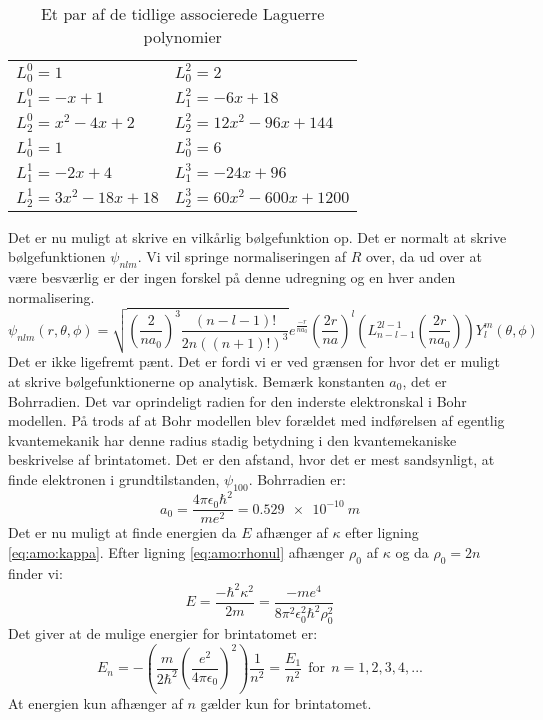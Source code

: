 \documentclass[../../Atom-ogMolekylefysik.tex]{subfiles}
\begin{document}
\begin{table}[h]
    \centering
    \begin{tabular}{ll}
        $L_0^0 = 1$ & $L_0^2 = 2$\\
        $L_1^0 = -x+1$ & $L_1^2 = -6x+18$\\
        $L_2^0 = x^2-4x+2$ & $L_2^2 = 12x^2-96x+144$\\
        $L_0^1 = 1$ & $L_0^3 = 6$\\
        $L_1^1 = -2x+4$ & $L_1^3 = -24x+96$\\
        $L_2^1 = 3x^2-18x+18$ & $L_2^3 = 60x^2-600x+1200$\\
    \end{tabular}
    \caption{Et par af de tidlige associerede Laguerre polynomier}
    \label{tab:amo:laguerre}
\end{table}
Det er nu muligt at skrive en vilkårlig bølgefunktion op. Det er normalt at skrive bølgefunktionen $\psi_{nlm}$. Vi vil springe normaliseringen af $R$ over, da ud over at være besværlig er der ingen forskel på denne udregning og en hver anden normalisering.
\begin{equation}
    \psi_{nlm}(r,\theta,\phi) = \sqrt{\left(\frac{2}{na_0}\right)^3\frac{(n-l-1)!}{2n((n+1)!)^3}}e^{\frac{-r}{na_0}}\left(\frac{2r}{na}\right)^l\left(L_{n-l-1}^{2l-1}\left(\frac{2r}{na_0}\right)\right)Y_l^m(\theta,\phi)
\end{equation}
Det er ikke ligefremt pænt. Det er fordi vi er ved grænsen for hvor det er muligt at skrive bølgefunktionerne op analytisk. 
Bemærk konstanten $a_0$, det er Bohrradien. Det var oprindeligt radien for den inderste elektronskal i Bohr modellen. På trods af at Bohr modellen blev forældet med indførelsen af egentlig kvantemekanik har denne radius stadig betydning i den kvantemekaniske beskrivelse af brintatomet. Det er den afstand, hvor det er mest sandsynligt, at finde elektronen i grundtilstanden, $\psi_{100}$. Bohrradien er:
\begin{equation}
    a_0 = \frac{4\pi\epsilon_0\hbar^2}{me^2} = \SI{0.529e-10}{m}
\end{equation}
Det er nu muligt at finde energien da $E$ afhænger af $\kappa$ efter ligning \eqref{eq:amo:kappa}. Efter ligning \eqref{eq:amo:rhonul} afhænger $\rho_0$ af $\kappa$ og da $\rho_0=2n$ finder vi:
\begin{equation}
    E = \frac{-\hbar^2\kappa^2}{2m} = \frac{-me^4}{8\pi^2\epsilon_0^2\hbar^2\rho_0^2}
\end{equation}
Det giver at de mulige energier for brintatomet er:
\begin{equation}
    E_n = -\left(\frac{m}{2\hbar^2}\left(\frac{e^2}{4\pi\epsilon_0}\right)^2\right)\frac{1}{n^2}= \frac{E_1}{n^2}~~\text{for}~~n=1,2,3,4,...
\end{equation}
At energien kun afhænger af $n$ gælder kun for brintatomet.
\end{document}
